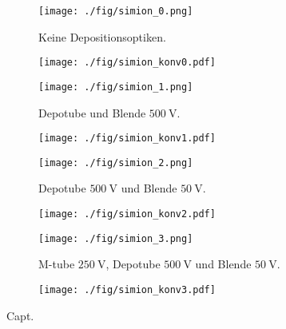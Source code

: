 \begin{figure}
  \begin{subfigure}[h]{0.50\textwidth}
    \texttt{[image: ./fig/simion\_0.png]}
    \caption{Keine Depositionsoptiken.}
    \label{fig:0}
  \end{subfigure}\hfill
  \begin{subfigure}[h]{0.45\textwidth}
    \texttt{[image: ./fig/simion\_konv0.pdf]}
    \label{fig:konv1}
  \end{subfigure}\hfill
  \begin{subfigure}[h]{0.50\textwidth}
    \texttt{[image: ./fig/simion\_1.png]}
    \caption{Depotube und Blende $\SI{500}{\volt}$.}
    \label{fig:konv2}
  \end{subfigure}\hfill
  \begin{subfigure}[h]{0.45\textwidth}
    \texttt{[image: ./fig/simion\_konv1.pdf]}
    \label{fig:konv3}
  \end{subfigure}\hfill
  \begin{subfigure}[h]{0.50\textwidth}
    \texttt{[image: ./fig/simion\_2.png]}
    \caption{Depotube $\SI{500}{\volt}$ und Blende $\SI{50}{\volt}$.}
    \label{fig:konv4}
  \end{subfigure}\hfill
  \begin{subfigure}[h]{0.45\textwidth}
    \texttt{[image: ./fig/simion\_konv2.pdf]}
    \label{fig:konv5}
  \end{subfigure}\hfill
  \begin{subfigure}[h]{0.50\textwidth}
    \texttt{[image: ./fig/simion\_3.png]}
    \caption{M-tube $\SI{250}{\volt}$, Depotube $\SI{500}{\volt}$ und Blende $\SI{50}{\volt}$.}
    \label{fig:konv6}
  \end{subfigure}\hfill
  \begin{subfigure}[h]{0.45\textwidth}
    \texttt{[image: ./fig/simion\_konv3.pdf]}
    \label{fig:konv7}
  \end{subfigure}
  \caption{Capt.}
  \label{fig:simion_konv}
\end{figure}


